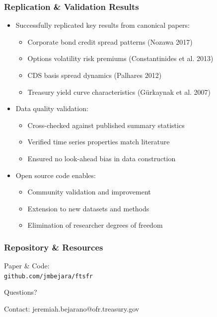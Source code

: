 \documentclass[ignorenonframetext, 9pt]{beamer}
\begin{document}
\begin{frame}
  \frametitle{Replication \& Validation Results}
  \label{slide:validation}
\begin{itemize}
\item \alert{Successfully replicated key results from canonical papers:}
\begin{itemize}
  \item Corporate bond credit spread patterns (Nozawa 2017)
  \item Options volatility risk premiums (Constantinides et al. 2013)
  \item CDS basis spread dynamics (Palhares 2012)
  \item Treasury yield curve characteristics (Gürkaynak et al. 2007)
\end{itemize}
\vspace{0.3cm}
\item \alert{Data quality validation:}
\begin{itemize}
  \item Cross-checked against published summary statistics
  \item Verified time series properties match literature
  \item Ensured no look-ahead bias in data construction
\end{itemize}
\vspace{0.3cm}
\item \alert{Open source code enables:}
\begin{itemize}
  \item Community validation and improvement
  \item Extension to new datasets and methods
  \item Elimination of researcher degrees of freedom
\end{itemize}
\end{itemize}
\end{frame}



\begin{frame}
  \frametitle{Repository \& Resources}
  \centering
  \vspace{1cm}
  \Large
  \alert{Paper \& Code:} \\
  \texttt{github.com/jmbejara/ftsfr}
  \vspace{1cm}

  \alert{Questions?}
  \vspace{0.5cm}

  \normalsize
  Contact: jeremiah.bejarano@ofr.treasury.gov
\end{frame}
\end{document}
